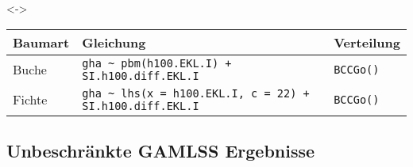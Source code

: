 \begin{frame}[c]
  \visible<\theSecondElement->{
    \begin{center}
      \begin{minipage}[t]{0.925\linewidth}
        {\scriptsize
          \begin{tabular}{l l l}
            \toprule
            Baumart & Gleichung & Verteilung \\
            \midrule
            Buche & \texttt{gha \textasciitilde{} pbm(h100.EKL.I) + SI.h100.diff.EKL.I} & \texttt{BCCGo()} \\
            Fichte & \texttt{gha \textasciitilde{} lhs(x = h100.EKL.I, c = 22) + SI.h100.diff.EKL.I} & \texttt{BCCGo()} \\
            \bottomrule
          \end{tabular}}
      \end{minipage}
    \end{center}}
\end{frame}

\subsection{Unbeschränkte GAMLSS \textendash{} Ergebnisse}

